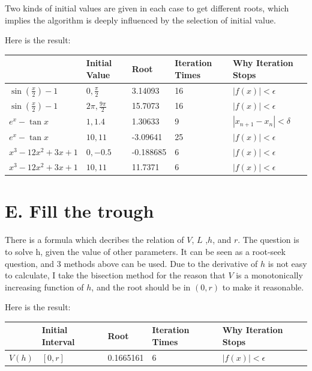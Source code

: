 \documentclass[a4paper]{article}
\begin{document}
Two kinds of initial values are given in each case to get different roots, which implies the algorithm is deeply influenced by the selection of initial value.

Here is the result:
\begin{table}[!ht]
    \centering
    \begin{tabular}{|l|l|l|l|l|}
    \hline
        ~ & Initial Value& Root & Iteration Times & Why Iteration Stops\\ \hline
        $\sin(\frac{x}{2}) - 1$ & $0,\frac{\pi}{2}$ & 3.14093 & 16 & $|f(x)| < \epsilon$ \\ \hline
        $\sin(\frac{x}{2}) - 1$ & $2\pi,\frac{9\pi}{2}$ & 15.7073 & 16 & $|f(x)| < \epsilon$ \\ \hline
        $e^{x} - \tan x$ & $1,1.4$ & 1.30633 & 9 & $|x_{n+1} - x_n| < \delta$ \\ \hline
        $e^{x} - \tan x$ & $10,11$ & -3.09641 & 25 & $|f(x)| < \epsilon$ \\ \hline
        $x^3 - 12x^2 + 3x + 1$ & $0,-0.5$ & -0.188685 & 6 & $|f(x)| < \epsilon$ \\ \hline
        $x^3 - 12x^2 + 3x + 1$ & $10,11$ & 11.7371 & 6 & $|f(x)| < \epsilon$ \\ \hline
    \end{tabular}
\end{table}

\section*{E. Fill the trough}

There is a formula which decribes the relation of $V$, $L$ ,$h$, and $r$. The question is to solve h, given the value of other parameters. It can be seen as a 
root-seek question, and 3 methods above can be used. Due to the derivative of $h$ is not easy to calculate, I take the bisection method for the reason that $V$ 
is a monotonically increasing function of $h$, and the root should be in $(0, r)$ to make it reasonable.

Here is the result:
\begin{table}[!ht]
    \centering
    \begin{tabular}{|l|l|l|l|l|}
    \hline
        ~ & Initial Interval& Root & Iteration Times & Why Iteration Stops\\ \hline
        $V(h)$ & $[0,r]$ & 0.1665161 & 6 & $|f(x)| < \epsilon$ \\ \hline
    \end{tabular}
\end{table}
\end{document}
